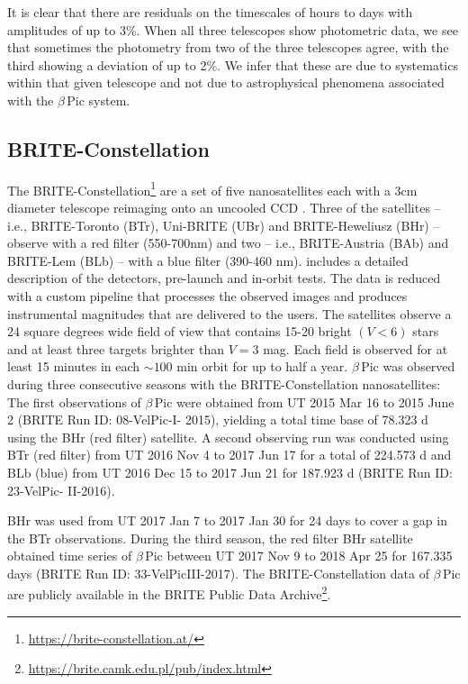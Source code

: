 \documentclass[longauth]{aa} %
\newcommand{\bp}{$\beta$\,Pic}
\begin{document}
It is clear that there are residuals on the timescales of hours to days with amplitudes of up to 3\%.
%
When all three telescopes show photometric data, we see that sometimes the photometry from two of the three telescopes agree, with the third showing a deviation of up to 2\%.
%
We infer that these are due to systematics within that given telescope and not due to astrophysical phenomena associated with the \bp{} system.

\subsection{BRITE-Constellation}

The BRITE-Constellation\footnote{\url{https://brite-constellation.at/}} are a set of five nanosatellites each with a 3cm diameter telescope reimaging onto an uncooled CCD \citep{Weiss14}.
%
Three of the satellites -- i.e., BRITE-Toronto (BTr), Uni-BRITE (UBr) and BRITE-Heweliusz (BHr) -- observe with a red filter (550-700nm) and two -- i.e., BRITE-Austria (BAb) and BRITE-Lem (BLb) --  with a blue filter (390-460 nm). \citet{pablo2016} includes a detailed description of the detectors, pre-launch and in-orbit tests. 
The data is reduced with a custom pipeline \citep{Popowicz17} that processes the observed images and produces instrumental magnitudes that are delivered to the users.
%
The satellites observe a 24 square degrees wide field of view that contains 15-20 bright $(V<6)$ stars and at least three targets brighter than $V=3$ mag. Each field is observed for at least 15 minutes in each $\sim 100$ min orbit for up to half a year.
%
\bp{} was observed during three consecutive seasons with the BRITE-Constellation nanosatellites:
The first observations of \bp{} were obtained
from UT 2015 Mar 16 to 2015 June 2 (BRITE Run ID: 08-VelPic-I-
2015), yielding a total time base of 78.323 d using the BHr (red filter) satellite. 
%
A second observing run was conducted using BTr (red filter) from 
UT 2016 Nov 4 to 2017 Jun 17
for a total of 224.573 d and BLb (blue) from 
UT 2016 Dec 15 to 2017 Jun 21 for 187.923 d 
(BRITE Run ID: 23-VelPic- II-2016).

BHr was used from UT 2017 Jan 7 to 2017 Jan 30
for 24 days to cover a gap in the BTr observations.
%
During the third season, the red filter BHr satellite obtained time series of \bp{} between 
UT 2017 Nov 9 to 2018 Apr 25 for 167.335 days 
(BRITE Run ID: 33-VelPicIII-2017).
%
The BRITE-Constellation data of \bp{} are publicly available in the BRITE Public Data Archive\footnote{\url{https://brite.camk.edu.pl/pub/index.html}}.
%
\end{document}
